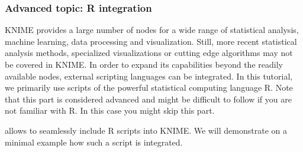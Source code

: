 \subsubsection{Advanced topic: R integration}

KNIME provides a large number of nodes for a wide range of statistical analysis, machine learning, data processing and visualization. Still, more recent statistical analysis methods, specialized visualizations or cutting edge algorithms may not be covered in KNIME. In order to expand its capabilities beyond the readily available nodes, external scripting languages can be integrated. In this tutorial, we primarily use scripts of the powerful statistical computing language R. Note that this part is considered advanced and might be difficult to follow if you are not familiar with R. In this case you might skip this part.

 allows to seamlessly include R scripts into KNIME. We will demonstrate on a minimal example how such a script is integrated.

